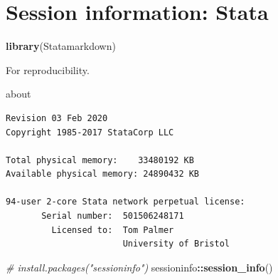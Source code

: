 \documentclass[
  10pt,
]{book}
\newenvironment{Shaded}{\begin{snugshade}}{\end{snugshade}}
\newcommand{\CommentTok}[1]{\textcolor[rgb]{0.56,0.35,0.01}{\textit{#1}}}
\newcommand{\KeywordTok}[1]{\textcolor[rgb]{0.13,0.29,0.53}{\textbf{#1}}}
\newcommand{\NormalTok}[1]{#1}
\newcommand{\OperatorTok}[1]{\textcolor[rgb]{0.81,0.36,0.00}{\textbf{#1}}}
\begin{document}
\hypertarget{session-information-stata}{%
\chapter*{Session information: Stata}\label{session-information-stata}}

\begin{Shaded}
\begin{Highlighting}[]
\KeywordTok{library}\NormalTok{(Statamarkdown)}
\end{Highlighting}
\end{Shaded}

For reproducibility.

\begin{Shaded}
\begin{Highlighting}[]
\NormalTok{about}
\end{Highlighting}
\end{Shaded}

\begin{verbatim}
Revision 03 Feb 2020
Copyright 1985-2017 StataCorp LLC

Total physical memory:    33480192 KB
Available physical memory: 24890432 KB

94-user 2-core Stata network perpetual license:
       Serial number:  501506248171
         Licensed to:  Tom Palmer
                       University of Bristol
\end{verbatim}

\begin{Shaded}
\begin{Highlighting}[]
\CommentTok{# install.packages("sessioninfo")}
\NormalTok{sessioninfo}\OperatorTok{::}\KeywordTok{session_info}\NormalTok{()}
\end{Highlighting}
\end{Shaded}
\end{document}
